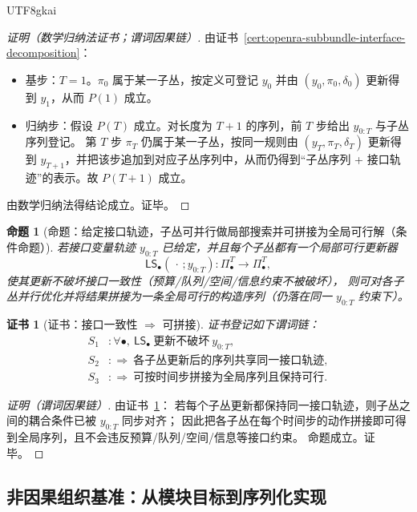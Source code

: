\documentclass[12pt]{article}
\newtheorem{proposition}{命题}[section]
\newtheorem{Certificate}{证书}[section]
\begin{document}
\begin{CJK*}{UTF8}{gkai}
\begin{proof}[证明（数学归纳法证书；谓词因果链）]
由证书~\ref{cert:openra-subbundle-interface-decomposition}：
\begin{itemize}
  \item 基步：$T=1$。$\pi_0$ 属于某一子丛，按定义可登记 $y_0$ 并由 $(y_0,\pi_0,\delta_0)$ 更新得到 $y_1$，从而 $P(1)$ 成立。
  \item 归纳步：假设 $P(T)$ 成立。对长度为 $T+1$ 的序列，前 $T$ 步给出 $y_{0:T}$ 与子丛序列登记。
  第 $T$ 步 $\pi_T$ 仍属于某一子丛，按同一规则由 $(y_T,\pi_T,\delta_T)$ 更新得到 $y_{T+1}$，并把该步追加到对应子丛序列中，从而仍得到“子丛序列 + 接口轨迹”的表示。故 $P(T+1)$
    成立。
\end{itemize}
由数学归纳法得结论成立。证毕。
\end{proof}

\begin{proposition}[命题：给定接口轨迹，子丛可并行做局部搜索并可拼接为全局可行解（条件命题）]
\label{prop:openra-subbundle-parallel-local-search}
若接口变量轨迹 $y_{0:T}$ 已给定，并且每个子丛都有一个局部可行更新器
\[
  \mathsf{LS}_{\bullet}(\,\cdot\,;y_{0:T}):\Pi_{\bullet}^{T}\to \Pi_{\bullet}^{T},
\]
使其更新不破坏接口一致性（预算/队列/空间/信息约束不被破坏），
则可对各子丛并行优化并将结果拼接为一条全局可行的构造序列（仍落在同一 $y_{0:T}$ 约束下）。
\end{proposition}

\begin{Certificate}[证书：接口一致性 $\Rightarrow$ 可拼接]
\label{cert:openra-subbundle-parallel-local-search}
证书登记如下谓词链：
\[
\begin{aligned}
  S_1 &: \forall \bullet,\ \mathsf{LS}_{\bullet}\ \text{更新不破坏}\ y_{0:T},\\
  S_2 &: \Rightarrow\ \text{各子丛更新后的序列共享同一接口轨迹},\\
  S_3 &: \Rightarrow\ \text{可按时间步拼接为全局序列且保持可行}.
\end{aligned}
\]
\end{Certificate}

\begin{proof}[证明（谓词因果链）]
由证书~\ref{cert:openra-subbundle-parallel-local-search}：
若每个子丛更新都保持同一接口轨迹，则子丛之间的耦合条件已被 $y_{0:T}$ 同步对齐；
因此把各子丛在每个时间步的动作拼接即可得到全局序列，且不会违反预算/队列/空间/信息等接口约束。
命题成立。证毕。
\end{proof}

\subsection{非因果组织基准：从模块目标到序列化实现}
\label{sec:openra-noncausal-organization-basis}


\end{CJK*}
\end{document}
